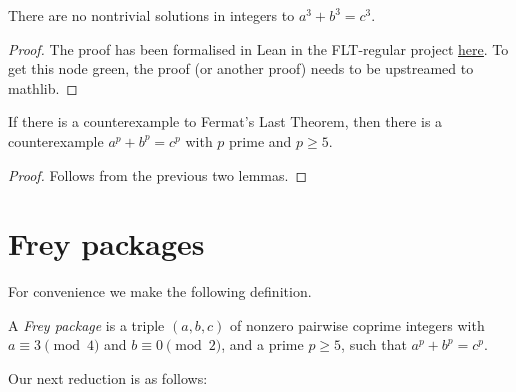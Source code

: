 \begin{lemma}\label{p_not_three}\leanok
{}
  There are no nontrivial solutions in integers to $a^3+b^3=c^3$.
\end{lemma}
\begin{proof}
  The proof has been formalised in Lean in the FLT-regular project \href{https://github.com/leanprover-community/flt-regular/blob/861b7df057140b45b8bb7d30d33426ffbbdda52b/FltRegular/FltThree/FltThree.lean#L698}{\underline{here}}. To get this node green, the proof (or another proof) needs to be upstreamed to mathlib.
\end{proof}

\begin{corollary}\label{WLOG_p_ge_5}\leanok If there is a counterexample to Fermat's Last Theorem, then there is a counterexample $a^p+b^p=c^p$ with $p$ prime and $p\geq 5$.
\end{corollary}
\begin{proof}\leanok Follows from the previous two lemmas.\end{proof}

\section{Frey packages}

For convenience we make the following definition.

\begin{definition}\label{Frey_package}\leanok A \emph{Frey package} is a triple $(a,b,c)$ of nonzero pairwise coprime integers with $a\equiv3\pmod4$ and $b\equiv0\pmod2$, and a prime $p\geq5$, such that $a^p+b^p=c^p$.\end{definition}

Our next reduction is as follows:

